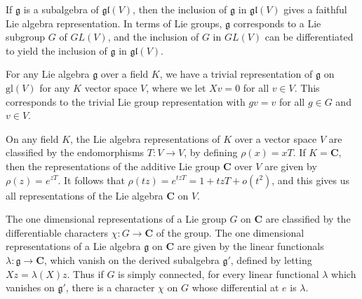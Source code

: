 \begin{example}
    If $\mathfrak{g}$ is a subalgebra of $\mathfrak{gl}(V)$, then the inclusion of $\mathfrak{g}$ in $\mathfrak{gl}(V)$ gives a faithful Lie algebra representation. In terms of Lie groups, $\mathfrak{g}$ corresponds to a Lie subgroup $G$ of $GL(V)$, and the inclusion of $G$ in $GL(V)$ can be differentiated to yield the inclusion of $\mathfrak{g}$ in $\mathfrak{gl}(V)$.
\end{example}

\begin{example}
    For any Lie algebra $\mathfrak{g}$ over a field $K$, we have a trivial representation of $\mathfrak{g}$ on $\text{gl}(V)$ for any $K$ vector space $V$, where we let $Xv = 0$ for all $v \in V$. This corresponds to the trivial Lie group representation with $gv = v$ for all $g \in G$ and $v \in V$.
\end{example}

\begin{example}
    On any field $K$, the Lie algebra representations of $K$ over a vector space $V$ are classified by the endomorphisms $T: V \to V$, by defining $\rho(x) = xT$. If $K = \mathbf{C}$, then the representations of the additive Lie group $\mathbf{C}$ over $V$ are given by $\rho(z) = e^{zT}$. It follows that $\rho(tz) = e^{tzT} = 1 + tzT + o(t^2)$, and this gives us all representations of the Lie algebra $\mathbf{C}$ on $V$.
\end{example}

\begin{example}
    The one dimensional representations of a Lie group $G$ on $\mathbf{C}$ are classified by the differentiable characters $\chi: G \to \mathbf{C}$ of the group. The one dimensional representations of a Lie algebra $\mathfrak{g}$ on $\mathbf{C}$ are given by the linear functionals $\lambda: \mathfrak{g} \to \mathbf{C}$, which vanish on the derived subalgebra $\mathfrak{g}'$, defined by letting $Xz = \lambda(X)z$. Thus if $G$ is simply connected, for every linear functional $\lambda$ which vanishes on $\mathfrak{g}'$, there is a character $\chi$ on $G$ whose differential at $e$ is $\lambda$.
\end{example}

